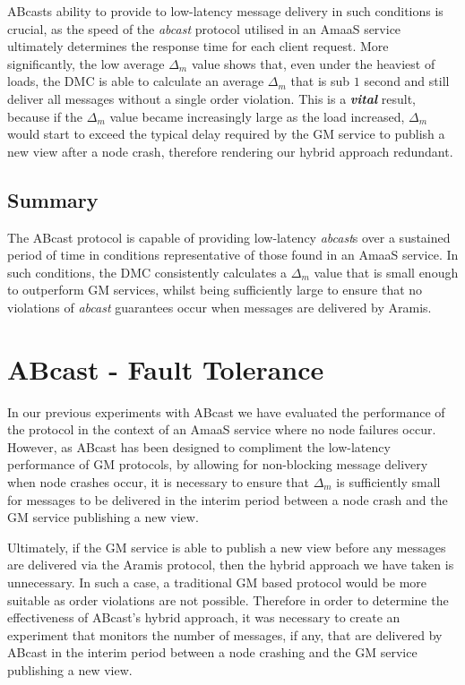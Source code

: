     \textsf{ABcast}s ability to provide to low-latency message delivery in such conditions is crucial, as the speed of the \emph{abcast} protocol utilised in an \textsf{AmaaS} service ultimately determines the response time for each client request.  More significantly, the low average $\Delta_m$ value shows that, even under the heaviest of loads, the DMC is able to calculate an average $\Delta_m$ that is sub $1$ second and still deliver all messages without a single order violation.  This is a \textbf{\emph{vital}} result, because if the $\Delta_m$ value became increasingly large as the load increased, $\Delta_m$ would start to exceed the typical delay required by the GM service to publish a new view after a node crash, therefore rendering our hybrid approach redundant.  
    
    \subsection{Summary}
    The \textsf{ABcast} protocol is capable of providing low-latency \emph{abcast}s over a sustained period of time in conditions representative of those found in an \textsf{AmaaS} service.  In such conditions, the DMC consistently calculates a $\Delta_m$ value that is small enough to outperform GM services, whilst being sufficiently large to ensure that no violations of \emph{abcast} guarantees occur when messages are delivered by \textsf{Aramis}.  
    
\section{ABcast - Fault Tolerance}\label{sec:infini_crashed_node}
    In our previous experiments with \textsf{ABcast} we have evaluated the performance of the protocol in the context of an \textsf{AmaaS} service where no node failures occur.  However, as \textsf{ABcast} has been designed to compliment the low-latency performance of GM protocols, by allowing for non-blocking message delivery when node crashes occur, it is necessary to ensure that $\Delta_m$ is sufficiently small for messages to be delivered in the interim period between a node crash and the GM service publishing a new view. 
    
    Ultimately, if the GM service is able to publish a new view before any messages are delivered via the \textsf{Aramis} protocol, then the hybrid approach we have taken is unnecessary.  In such a case, a traditional GM based protocol would be more suitable as order violations are not possible.  Therefore in order to determine the effectiveness of \textsf{ABcast}'s hybrid approach, it was necessary to create an experiment that monitors the number of messages, if any, that are delivered by \textsf{ABcast} in the interim period between a node crashing and the GM service publishing a new view.
    
